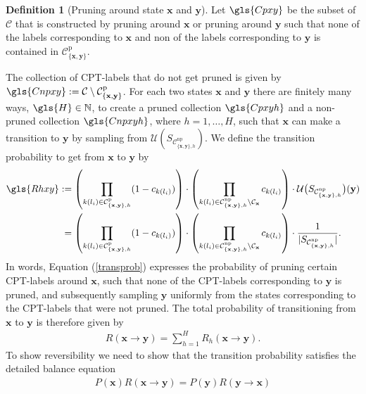 \documentclass[a4paper, twoside, 11pt]{report}
\newcommand{\bfx}{{\mathbf{x}}}
\newcommand{\C}{{\mathcal C}}
\newcommand{\U}{{\mathcal{U}}}
\theoremstyle{plain}
\theoremstyle{definition}
\newtheorem{definition}[thm]{Definition}
\theoremstyle{remark}
\newcommand{\bfy}{{\mathbf{y}}}
\def\N{{\mathbb N}}
\begin{document}
\begin{definition}[Pruning around state $\bfx$ and $\bfy$]
Let $\gls{Cpxy}$ be the subset of $\mathcal{C}$ that is constructed by pruning around $\mathbf{x}$ or pruning around $\mathbf{y}$ such that none of the labels corresponding to $\mathbf{x}$ and non of the labels corresponding to $\mathbf{y}$ is contained in $\mathcal{C}_{\{\mathbf{x}, \mathbf{y}\}}^{\text{p}}$.
\end{definition}
The collection of CPT-labels that do not get pruned is given by $\gls{Cnpxy} := \C \setminus \mathcal{C}_{\{\mathbf{x}, \mathbf{y}\}}^{\text{p}}$. For each two states $\bfx$ and $\bfy$ there are finitely many ways, $\gls{H} \in \N$, to create a pruned collection $\gls{Cpxyh}$ and a non-pruned collection $\gls{Cnpxyh}$, where $h =1,\ldots, H$, such that $\bfx$ can make a transition to $\bfy$ by sampling from $\U(S_{\C_{\{\bfx, \bfy\},h}^{\text{np}}})$. We define the transition probability to get from $\bfx$ to $\bfy$ by
\begin{align}\label{transprob}
\gls{Rhxy} &:= \left(\prod_{k(l_i) \in \C_{\{\bfx, \bfy\},h}^{\text{p}} } (1-c_{k(l_i)}) \right) \cdot \left( \prod_{k(l_i) \in \C_{\{\bfx, \bfy\},h}^{\text{np}} \setminus \mathcal{C}_{\mathbf{x}}  } c_{k(l_i)}   \right) \cdot \mathcal{U} \big( S_{\C_{\{\bfx, \bfy\},h}^{\text{np}}} \big)(\mathbf{y}) \\ \nonumber
&\;=\left(\prod_{k(l_i) \in \C_{\{\bfx, \bfy\},h}^{\text{p}} } (1-c_{k(l_i)}) \right)\cdot \left( \prod_{k(l_i) \in \C_{\{\bfx, \bfy\},h}^{\text{np}} \setminus \mathcal{C}_{\mathbf{x}}  } c_{k(l_i)}   \right)  \nonumber \cdot \frac{1}{|S_{\C_{\{\bfx, \bfy\},h}^{\text{np}}}|}.
\end{align}
In words, Equation (\ref{transprob}) expresses the probability of pruning certain CPT-labels around $\bfx$, such that none of the CPT-labels corresponding to $\bfy$ is pruned, and subsequently sampling $\bfy$ uniformly from the states corresponding to the CPT-labels that were not pruned. The total probability of transitioning from $\bfx$ to $\bfy$ is therefore given by
\begin{align} \label{total}
{R}(\mathbf{x} \to \mathbf{y}) = \sum_{h=1}^{H} {R}_h (\mathbf{x} \to \mathbf{y}).
\end{align}
To show reversibility we need to show that the transition probability satisfies the detailed balance equation
\begin{align*}
P(\mathbf{x}) R(\mathbf{x} \to \mathbf{y}) = P(\mathbf{y}) R(\mathbf{y} \to \mathbf{x}) 
\end{align*}
\end{document}
